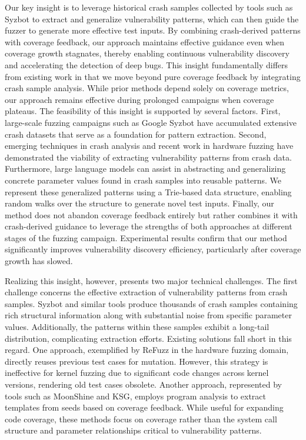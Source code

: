 Our key insight is to leverage historical crash samples collected by tools such as Syzbot to extract and generalize vulnerability patterns, which can then guide the fuzzer to generate more effective test inputs. By combining crash-derived patterns with coverage feedback, our approach maintains effective guidance even when coverage growth stagnates, thereby enabling continuous vulnerability discovery and accelerating the detection of deep bugs. This insight fundamentally differs from existing work in that we move beyond pure coverage feedback by integrating crash sample analysis. While prior methods depend solely on coverage metrics, our approach remains effective during prolonged campaigns when coverage plateaus. The feasibility of this insight is supported by several factors. First, large-scale fuzzing campaigns such as Google Syzbot have accumulated extensive crash datasets that serve as a foundation for pattern extraction. Second, emerging techniques in crash analysis and recent work in hardware fuzzing have demonstrated the viability of extracting vulnerability patterns from crash data. Furthermore, large language models can assist in abstracting and generalizing concrete parameter values found in crash samples into reusable patterns. We represent these generalized patterns using a Trie-based data structure, enabling random walks over the structure to generate novel test inputs. Finally, our method does not abandon coverage feedback entirely but rather combines it with crash-derived guidance to leverage the strengths of both approaches at different stages of the fuzzing campaign. Experimental results confirm that our method significantly improves vulnerability discovery efficiency, particularly after coverage growth has slowed.

Realizing this insight, however, presents two major technical challenges. The first challenge concerns the effective extraction of vulnerability patterns from crash samples. Syzbot and similar tools produce thousands of crash samples containing rich structural information along with substantial noise from specific parameter values. Additionally, the patterns within these samples exhibit a long-tail distribution, complicating extraction efforts. Existing solutions fall short in this regard. One approach, exemplified by ReFuzz in the hardware fuzzing domain, directly reuses previous test cases for mutation. However, this strategy is ineffective for kernel fuzzing due to significant code changes across kernel versions, rendering old test cases obsolete. Another approach, represented by tools such as MoonShine and KSG, employs program analysis to extract templates from seeds based on coverage feedback. While useful for expanding code coverage, these methods focus on coverage rather than the system call structure and parameter relationships critical to vulnerability patterns.

